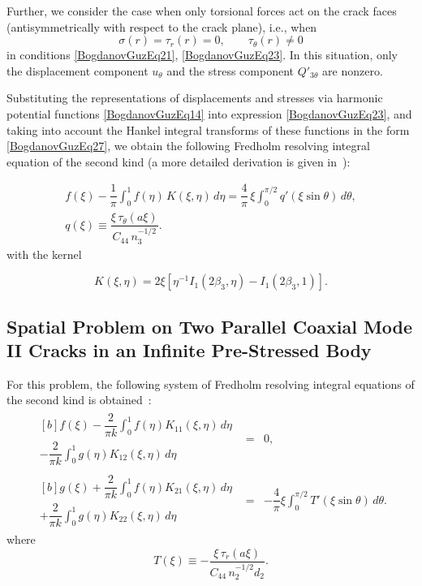 Further, we consider the case when only torsional forces act on the crack faces (antisymmetrically with respect to the crack plane), i.e., when
\[
\sigma(r)=\tau_r(r)=0, \qquad \tau_\theta(r)\ne 0
\]
in conditions \eqref{BogdanovGuzEq21}, \eqref{BogdanovGuzEq23}. In this situation, only the displacement component $u_\theta$ and the stress component $Q'_{3\theta}$ are nonzero.

Substituting the representations of displacements and stresses via harmonic potential functions \eqref{BogdanovGuzEq14} into expression \eqref{BogdanovGuzEq23}, and taking into account the Hankel integral transforms of these functions in the form \eqref{BogdanovGuzEq27}, we obtain the following Fredholm resolving integral equation of the second kind (a more detailed derivation is given in~\cite{BogdanovGuz32}):

\begin{equation}\label{BogdanovGuzEq39}
	\begin{array}{r}
		f(\xi)-\dfrac{1}{\pi}\int_{0}^{1} f(\eta)\,K(\xi,\eta)\,d\eta
		=\dfrac{4}{\pi}\,\xi \displaystyle\int_{0}^{\pi/2} q'(\xi\sin\theta)\,d\theta,
		\\
		q(\xi)\equiv \dfrac{\xi\,\tau_\theta(a\xi)}{C_{44}\,n_3^{-1/2}} .
	\end{array}
\end{equation}
%
with the kernel

\begin{equation}\label{BogdanovGuzEq40}
	K(\xi,\eta)=2\xi\left[\eta^{-1}I_1(2\beta_3,\eta)-I_1(2\beta_3,1)\right].
\end{equation}


\subsection{Spatial Problem on Two Parallel Coaxial Mode II Cracks in an Infinite Pre-Stressed Body}

For this problem, the following system of Fredholm resolving integral equations of the second kind is obtained~\cite{BogdanovGuz32}:
\begin{equation}\label{BogdanovGuzEq41}
	\begin{array}{rcl}
		\begin{multlined}[b]
			f(\xi)-\dfrac{2}{\pi k}\displaystyle\int_{0}^{1}f(\eta)K_{11}(\xi,\eta)\,d\eta
			\\[-1em]
				-\dfrac{2}{\pi k}\displaystyle\int_{0}^{1}g(\eta)K_{12}(\xi,\eta)\,d\eta
		\end{multlined}
		&=&0, 
		\\[1em]
		\begin{multlined}[b]
			g(\xi)+\dfrac{2}{\pi k}\displaystyle\int_{0}^{1}f(\eta)K_{21}(\xi,\eta)\,d\eta
			\\[-1em]
			+\dfrac{2}{\pi k}\displaystyle\int_{0}^{1}g(\eta)K_{22}(\xi,\eta)\,d\eta
		\end{multlined}
		&=&-\dfrac{4}{\pi}\xi\displaystyle\int_{0}^{\pi/2}T'(\xi\sin\theta)\,d\theta .
	\end{array}
\end{equation}
%
where
\[
T(\xi)\equiv
-\frac{\xi\,\tau_r(a\xi)}{C_{44}\,n_2^{-1/2}d_2}.
\]

